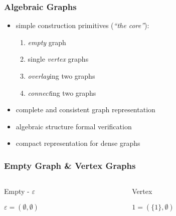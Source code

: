 \documentclass{beamer}
\renewcommand{\epsilon}{\varepsilon}
\newcommand{\eps}{\epsilon}
\begin{document}
\begin{frame}
  \frametitle{Algebraic Graphs}
  \begin{itemize}[<+->]
  \item simple construction primitives (\emph{``the core''}):
    \begin{enumerate}
    \item \emph{empty} graph
    \item single \emph{vertex} graphs
    \item \emph{overlay}ing two graphs
    \item \emph{connect}ing two graphs
    \end{enumerate}
  \item complete and \alert{consistent} graph representation
  \item algebraic structure \textrightarrow{} formal verification
  \item compact representation for dense graphs
  \end{itemize}
  
\end{frame}

\begin{frame}
  \frametitle{Empty Graph \& Vertex Graphs}
  \begin{columns}[t]
    \onslide<+->
    \begin{column}{.45\textwidth}
      \begin{exampleblock}{Empty - $\eps$}
        \vspace{5pt}
        \centering 
        
        $\eps = (\emptyset, \emptyset)$
      \end{exampleblock}
    \end{column}
    \onslide<+->
    \begin{column}{.45\textwidth}
      \begin{exampleblock}{Vertex}
        \vspace{5pt}
        \centering

        $1 = (\{1\}, \emptyset)$
      \end{exampleblock}
    \end{column}
  \end{columns}
\end{frame}
\end{document}
